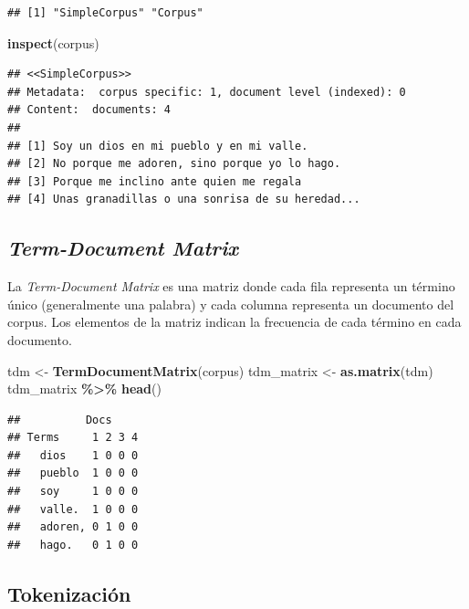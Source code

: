 \documentclass[
]{article}
\newenvironment{Shaded}{\begin{snugshade}}{\end{snugshade}}
\newcommand{\FunctionTok}[1]{\textcolor[rgb]{0.13,0.29,0.53}{\textbf{#1}}}
\newcommand{\NormalTok}[1]{#1}
\newcommand{\OtherTok}[1]{\textcolor[rgb]{0.56,0.35,0.01}{#1}}
\newcommand{\SpecialCharTok}[1]{\textcolor[rgb]{0.81,0.36,0.00}{\textbf{#1}}}
\begin{document}
\begin{verbatim}
## [1] "SimpleCorpus" "Corpus"
\end{verbatim}

\begin{Shaded}
\begin{Highlighting}[]
\FunctionTok{inspect}\NormalTok{(corpus) }
\end{Highlighting}
\end{Shaded}

\begin{verbatim}
## <<SimpleCorpus>>
## Metadata:  corpus specific: 1, document level (indexed): 0
## Content:  documents: 4
## 
## [1] Soy un dios en mi pueblo y en mi valle.        
## [2] No porque me adoren, sino porque yo lo hago.   
## [3] Porque me inclino ante quien me regala         
## [4] Unas granadillas o una sonrisa de su heredad...
\end{verbatim}

\hypertarget{term-document-matrix}{%
\subsection{\texorpdfstring{\emph{Term-Document
Matrix}}{Term-Document Matrix}}\label{term-document-matrix}}

La \emph{Term-Document Matrix} es una matriz donde cada fila representa
un término único (generalmente una palabra) y cada columna representa un
documento del corpus. Los elementos de la matriz indican la frecuencia
de cada término en cada documento.

\begin{Shaded}
\begin{Highlighting}[]
\NormalTok{tdm }\OtherTok{\textless{}{-}} \FunctionTok{TermDocumentMatrix}\NormalTok{(corpus)}
\NormalTok{tdm\_matrix }\OtherTok{\textless{}{-}} \FunctionTok{as.matrix}\NormalTok{(tdm)}
\NormalTok{tdm\_matrix }\SpecialCharTok{\%\textgreater{}\%} \FunctionTok{head}\NormalTok{()}
\end{Highlighting}
\end{Shaded}

\begin{verbatim}
##          Docs
## Terms     1 2 3 4
##   dios    1 0 0 0
##   pueblo  1 0 0 0
##   soy     1 0 0 0
##   valle.  1 0 0 0
##   adoren, 0 1 0 0
##   hago.   0 1 0 0
\end{verbatim}

\hypertarget{tokenizaciuxf3n}{%
\subsection{Tokenización}\label{tokenizaciuxf3n}}
\end{document}
